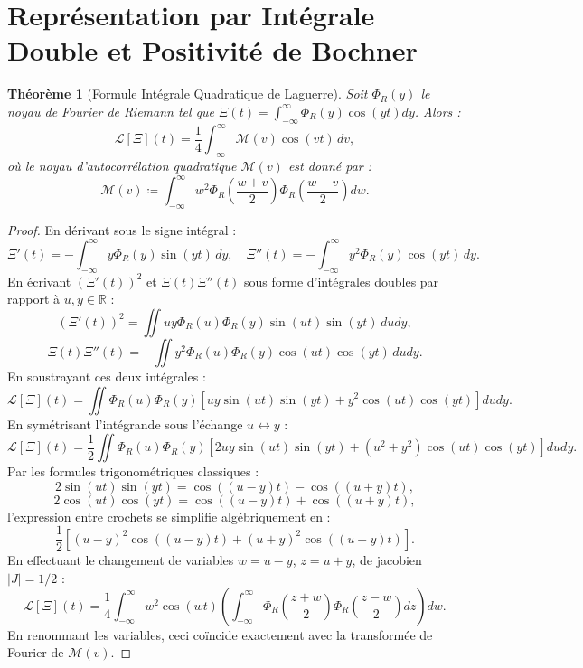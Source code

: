\documentclass[11pt,a4paper]{article}
\newtheorem{theorem}{Théorème}[section]
\theoremstyle{definition}
\theoremstyle{remark}
\begin{document}
\section{Représentation par Intégrale Double et Positivité de Bochner}

\begin{theorem}[Formule Intégrale Quadratique de Laguerre]
Soit $\Phi_R(y)$ le noyau de Fourier de Riemann tel que $\Xi(t) = \int_{-\infty}^\infty \Phi_R(y) \cos(yt) dy$. Alors :
\begin{equation}
\mathcal{L}[\Xi](t) = \frac{1}{4}\int_{-\infty}^\infty \mathcal{M}(v) \cos(vt)\, dv,
\end{equation}
où le noyau d'autocorrélation quadratique $\mathcal{M}(v)$ est donné par :
\begin{equation}
\mathcal{M}(v) \coloneqq \int_{-\infty}^\infty w^2 \Phi_R\left(\frac{w+v}{2}\right) \Phi_R\left(\frac{w-v}{2}\right) dw.
\end{equation}
\end{theorem}

\begin{proof}
En dérivant sous le signe intégral :
\[
\Xi'(t) = -\int_{-\infty}^\infty y \Phi_R(y) \sin(yt)\, dy, \quad \Xi''(t) = -\int_{-\infty}^\infty y^2 \Phi_R(y) \cos(yt)\, dy.
\]
En écrivant $(\Xi'(t))^2$ et $\Xi(t)\Xi''(t)$ sous forme d'intégrales doubles par rapport à $u, y \in \mathbb{R}$ :
\[
(\Xi'(t))^2 = \iint u y \Phi_R(u)\Phi_R(y) \sin(ut)\sin(yt)\, du dy,
\]
\[
\Xi(t)\Xi''(t) = -\iint y^2 \Phi_R(u)\Phi_R(y) \cos(ut)\cos(yt)\, du dy.
\]
En soustrayant ces deux intégrales :
\[
\mathcal{L}[\Xi](t) = \iint \Phi_R(u)\Phi_R(y) \left[ u y \sin(ut)\sin(yt) + y^2 \cos(ut)\cos(yt) \right] du dy.
\]
En symétrisant l'intégrande sous l'échange $u \leftrightarrow y$ :
\[
\mathcal{L}[\Xi](t) = \frac{1}{2} \iint \Phi_R(u)\Phi_R(y) \left[ 2 u y \sin(ut)\sin(yt) + (u^2 + y^2) \cos(ut)\cos(yt) \right] du dy.
\]
Par les formules trigonométriques classiques :
\[
2\sin(ut)\sin(yt) = \cos((u-y)t) - \cos((u+y)t),
\]
\[
2\cos(ut)\cos(yt) = \cos((u-y)t) + \cos((u+y)t),
\]
l'expression entre crochets se simplifie algébriquement en :
\[
\frac{1}{2} \left[ (u - y)^2 \cos((u-y)t) + (u + y)^2 \cos((u+y)t) \right].
\]
En effectuant le changement de variables $w = u - y$, $z = u + y$, de jacobien $|J| = 1/2$ :
\[
\mathcal{L}[\Xi](t) = \frac{1}{4} \int_{-\infty}^\infty w^2 \cos(wt) \left( \int_{-\infty}^\infty \Phi_R\left(\frac{z+w}{2}\right) \Phi_R\left(\frac{z-w}{2}\right) dz \right) dw.
\]
En renommant les variables, ceci coïncide exactement avec la transformée de Fourier de $\mathcal{M}(v)$.
\end{proof}
\end{document}
